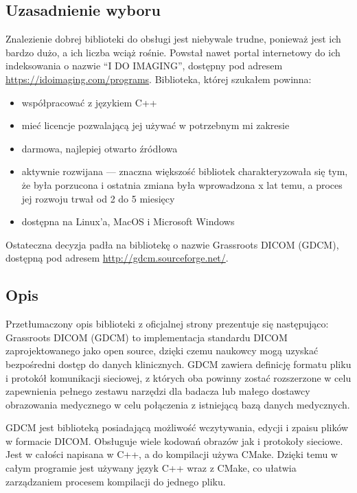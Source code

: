 

\subsection{Uzasadnienie wyboru}

\par
Znalezienie dobrej biblioteki do obsługi jest niebywale trudne, ponieważ jest ich bardzo dużo, a ich liczba wciąż rośnie.
Powstał nawet portal internetowy do ich indeksowania o nazwie \enquote{I DO IMAGING}, dostępny pod adresem \url{https://idoimaging.com/programs}.
Biblioteka, której szukałem powinna:
\begin{itemize}
    \item współpracować z językiem C++
    \item mieć licencje pozwalającą jej używać w potrzebnym mi zakresie
    \item darmowa, najlepiej otwarto źródłowa
    \item aktywnie rozwijana --- znaczna większość bibliotek charakteryzowała się tym, że była porzucona i ostatnia zmiana była wprowadzona x lat temu, a proces jej rozwoju trwał od 2 do 5 miesięcy
    \item dostępna na Linux'a, MacOS i Microsoft Windows
\end{itemize}
Ostateczna decyzja padła na bibliotekę o nazwie Grassroots DICOM (GDCM), dostępną pod adresem \url{http://gdcm.sourceforge.net/}.

\subsection{Opis}

\par
Przetłumaczony opis biblioteki z oficjalnej strony prezentuje się następująco:
Grassroots DICOM (GDCM) to implementacja standardu DICOM zaprojektowanego jako open source, dzięki czemu naukowcy mogą uzyskać bezpośredni dostęp do danych klinicznych.
GDCM zawiera definicję formatu pliku i protokół komunikacji sieciowej, z których oba powinny zostać rozszerzone w celu zapewnienia pełnego zestawu narzędzi dla badacza lub małego dostawcy obrazowania medycznego w celu połączenia z istniejącą bazą danych medycznych.

\par
GDCM jest biblioteką posiadającą możliwość wczytywania, edycji i zpaisu plików w formacie DICOM.
Obsługuje wiele kodowań obrazów jak i protokoły sieciowe.
Jest w całości napisana w C++, a do kompilacji używa CMake.
Dzięki temu w całym programie jest używany język C++ wraz z CMake, co ułatwia zarządzaniem procesem kompilacji do jednego pliku.

